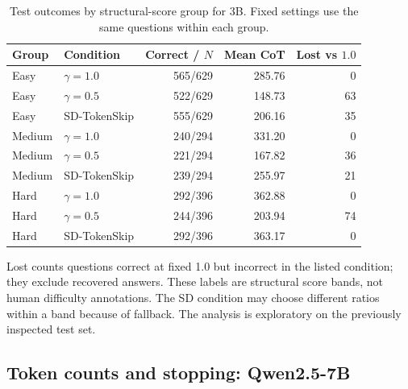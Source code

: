 \begin{table}[H]\centering\small

\caption{Test outcomes by structural-score group for 3B. Fixed settings use the same questions within each group.}

\begin{tabular}{llrrr}

\toprule

Group & Condition & Correct / $N$ & Mean CoT & Lost vs $1.0$\\

\midrule

Easy & $\gamma=1.0$ & 565/629 & 285.76 & 0\\

Easy & $\gamma=0.5$ & 522/629 & 148.73 & 63\\

Easy & SD-TokenSkip & 555/629 & 206.16 & 35\\

Medium & $\gamma=1.0$ & 240/294 & 331.20 & 0\\

Medium & $\gamma=0.5$ & 221/294 & 167.82 & 36\\

Medium & SD-TokenSkip & 239/294 & 255.97 & 21\\

Hard & $\gamma=1.0$ & 292/396 & 362.88 & 0\\

Hard & $\gamma=0.5$ & 244/396 & 203.94 & 74\\

Hard & SD-TokenSkip & 292/396 & 363.17 & 0\\

\bottomrule\end{tabular}\end{table}

Lost counts questions correct at fixed 1.0 but incorrect in the listed condition; they exclude recovered answers. These labels are structural score bands, not human difficulty annotations. The SD condition may choose different ratios within a band because of fallback. The analysis is exploratory on the previously inspected test set.

\subsection{Token counts and stopping: Qwen2.5-7B}

